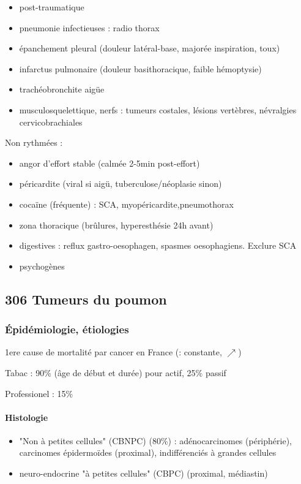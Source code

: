 \documentclass[11pt]{article}
\begin{document}
\begin{itemize}
\item post-traumatique
\item pneumonie infectieuses : radio thorax
\item épanchement pleural (douleur latéral-base, majorée inspiration, toux)
\item infarctus pulmonaire (douleur basithoracique, faible hémoptysie)
\item trachéobronchite aigüe
\item musculosquelettique, nerfs : tumeurs costales, lésions vertèbres,
névralgies cervicobrachiales
\end{itemize}

Non rythmées :

\begin{itemize}
\item angor d'effort stable (calmée 2-5min post-effort)
\item péricardite (viral si aigü, tuberculose/néoplasie sinon)
\item cocaïne (fréquente) : SCA, myopéricardite,pneumothorax
\item zona thoracique (brûlures, hyperesthésie 24h avant)
\item digestives : reflux gastro-oesophagen, spasmes oesophagiens. Exclure SCA
\faBomb
\item psychogènes
\end{itemize}

\subsection{306 \textdagger{} Tumeurs du poumon}
\label{sec:org22ed245}
\label{sec:306_tumeurs_du_poumon}

\subsubsection{Épidémiologie, étiologies}
\label{sec:org78e6395}
1ere cause de mortalité par cancer en France (\male : constante, \female
\(\nearrow\))

Tabac : 90\% (âge de début et durée) pour actif, 25\% passif

Professionel : 15\%

\paragraph{Histologie}
\label{sec:org07824c0}

\begin{itemize}
\item "Non à petites cellules" (CBNPC) (80\%) : adénocarcinomes (périphérie),
carcinomes épidermoïdes (proximal), indifférenciés à grandes cellules
\item neuro-endocrine "à petites cellules" (CBPC) (proximal, médiastin)
\end{itemize}
\end{document}
